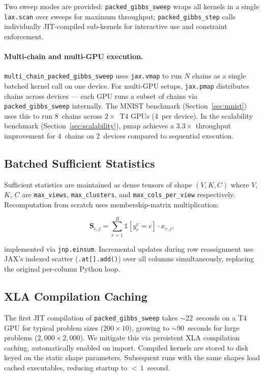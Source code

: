 \documentclass[11pt]{article}
\begin{document}
Two sweep modes are provided: \texttt{packed\_gibbs\_sweep} wraps all
kernels in a single \texttt{lax.scan} over sweeps for maximum throughput;
\texttt{packed\_gibbs\_step} calls individually JIT-compiled sub-kernels
for interactive use and constraint enforcement.

\paragraph{Multi-chain and multi-GPU execution.}
\texttt{multi\_chain\_packed\_gibbs\_sweep} uses \texttt{jax.vmap} to
run $N$ chains as a single batched kernel call on one device. For
multi-GPU setups, \texttt{jax.pmap} distributes chains across devices
--- each GPU runs a subset of chains via \texttt{packed\_gibbs\_sweep}
internally. The MNIST benchmark (Section~\ref{sec:mnist}) uses this to
run 8~chains across $2\times$~T4 GPUs (4~per device). In the scalability
benchmark (Section~\ref{sec:scalability}), pmap achieves a $3.3\times$
throughput improvement for 4~chains on 2~devices compared to sequential
execution.

\subsection{Batched Sufficient Statistics}

Sufficient statistics are maintained as dense tensors of shape
$(V, K, C)$ where $V$, $K$, $C$ are \texttt{max\_views},
\texttt{max\_clusters}, and \texttt{max\_cols\_per\_view} respectively.
Recomputation from scratch uses membership-matrix multiplication:

\begin{equation}
  \mathbf{S}_{c,j} = \sum_{r=1}^{R} \mathbb{1}[y_r^v = c] \cdot x_{r,j},
\end{equation}

implemented via \texttt{jnp.einsum}. Incremental updates during row
reassignment use JAX's indexed scatter (\texttt{.at[].add()}) over all
columns simultaneously, replacing the original per-column Python loop.

\subsection{XLA Compilation Caching}

The first JIT compilation of \texttt{packed\_gibbs\_sweep} takes
${\sim}$22~seconds on a T4 GPU for typical problem sizes
($200 \times 10$), growing to ${\sim}$90~seconds for large problems
($2{,}000 \times 2{,}000$). We mitigate this via persistent XLA
compilation caching, automatically enabled on import. Compiled kernels
are stored to disk keyed on the static shape parameters. Subsequent
runs with the same shapes load cached executables, reducing startup
to ${<}\,1$~second.
\end{document}
